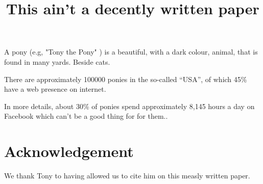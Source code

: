 \documentclass{article}
\begin{document}
    \title {This ain't a decently written paper}
    \maketitle
A pony (e.g, "Tony the Pony" \cite{tony}) is a beautiful, with a dark 
colour, animal, that is found in many yards. Beside cats.

There are approximately 100000 ponies in the so-called ``USA'', of which 
45\% have a web presence on internet.

In more details, about 30\% of ponies spend approximately 8,145 hours a day on 
Facebook which can't be a good thing for for them..



\section*{Acknowledgement}
We thank Tony to having allowed us to cite him on this measly written paper.
\end{document}
